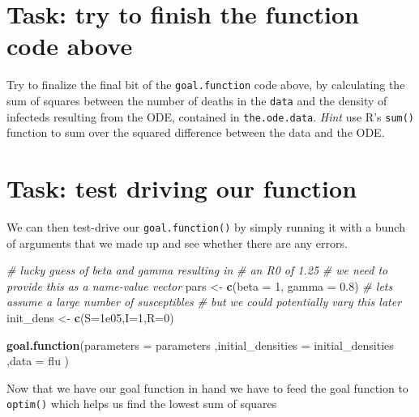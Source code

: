 \documentclass[
]{book}
\newenvironment{Shaded}{\begin{snugshade}}{\end{snugshade}}
\newcommand{\AttributeTok}[1]{\textcolor[rgb]{0.13,0.29,0.53}{#1}}
\newcommand{\CommentTok}[1]{\textcolor[rgb]{0.56,0.35,0.01}{\textit{#1}}}
\newcommand{\DecValTok}[1]{\textcolor[rgb]{0.00,0.00,0.81}{#1}}
\newcommand{\FloatTok}[1]{\textcolor[rgb]{0.00,0.00,0.81}{#1}}
\newcommand{\FunctionTok}[1]{\textcolor[rgb]{0.13,0.29,0.53}{\textbf{#1}}}
\newcommand{\NormalTok}[1]{#1}
\newcommand{\OtherTok}[1]{\textcolor[rgb]{0.56,0.35,0.01}{#1}}
\theoremstyle{definition}
\theoremstyle{definition}
\theoremstyle{definition}
\theoremstyle{definition}
\theoremstyle{remark}
\begin{document}
\section{Task: try to finish the function code above}\label{task-try-to-finish-the-function-code-above}

Try to finalize the final bit of the \texttt{goal.function} code above, by
calculating the sum of squares between
the number of deaths in the \texttt{data} and the density of
infecteds resulting from the ODE, contained in \texttt{the.ode.data}. \emph{Hint} use R's \texttt{sum()}
function to sum over the squared difference between the
data and the ODE.

\section{Task: test driving our function}\label{task-test-driving-our-function}

We can then test-drive our \texttt{goal.function()}
by simply running it with a bunch of arguments
that we made up and see whether there are any
errors.

\begin{Shaded}
\begin{Highlighting}[]
\CommentTok{\# lucky guess of beta and gamma resulting in}
\CommentTok{\# an R0 of 1.25}
\CommentTok{\# we need to provide this as a name{-}value vector}
\NormalTok{pars }\OtherTok{\textless{}{-}} \FunctionTok{c}\NormalTok{(}\AttributeTok{beta =} \DecValTok{1}\NormalTok{, }\AttributeTok{gamma =} \FloatTok{0.8}\NormalTok{)}
\CommentTok{\# lets assume a large number of susceptibles}
\CommentTok{\# but we could potentially vary this later}
\NormalTok{init\_dens }\OtherTok{\textless{}{-}} \FunctionTok{c}\NormalTok{(}\AttributeTok{S=}\FloatTok{1e05}\NormalTok{,}\AttributeTok{I=}\DecValTok{1}\NormalTok{,}\AttributeTok{R=}\DecValTok{0}\NormalTok{)}

\FunctionTok{goal.function}\NormalTok{(}\AttributeTok{parameters =}\NormalTok{ parameters }
\NormalTok{              ,}\AttributeTok{initial\_densities =}\NormalTok{ initial\_densities}
\NormalTok{              ,}\AttributeTok{data =}\NormalTok{ flu}
\NormalTok{              )}
\end{Highlighting}
\end{Shaded}

Now that we have our goal function in hand we
have to feed the goal function to \texttt{optim()}
which helps us find the lowest sum of squares
\end{document}
